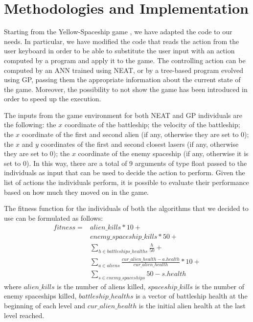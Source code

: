 \section{Methodologies and Implementation}
Starting from the Yellow-Spaceship game \cite{Yellow-Spaceship}, we have adapted the code to our needs.
In particular, we have modified the code that reads the action from the user keyboard in order to be
able to substitute the user input with an action computed by a program and apply it to the game.
The controlling action can be computed by an ANN trained using NEAT, or by a tree-based program evolved 
using GP, passing them the appropriate information about the current state of the game.
Moreover, the possibility to not show the game has been introduced in order to speed up the execution.

The inputs from the game environment for both NEAT and GP individuals are the following:
the $x$ coordinate of the battleship; the velocity of the battleship;
the $x$ coordinate of the first and second alien (if any, otherwise they are set to 0);
the $x$ and $y$ coordinates of the first and second closest lasers (if any, otherwise they are set to 0);
the $x$ coordinate of the enemy spaceship (if any, otherwise it is set to 0).
In this way, there are a total of 9 arguments of type float passed to the individuals as input that
can be used to decide the action to perform. Given the list of actions the individuals perform, it is
possible to evaluate their performance based on how much they moved on in the game.

The fitness function for the individuals of both the algorithms that we decided to use can be
formulated as follows:
\begin{equation}
\begin{split}
    fitness = & alien\_kills * 10 + \\
              & enemy\_spaceship\_kills * 50 + \\
              & \sum_{h \in battleships\_healths}^{} \frac{h}{50} + \\
              & \sum_{a \in aliens}^{} \frac{cur\_alien\_health - a.health}{cur\_alien\_health} * 10 + \\
              & \sum_{s \in enemy\_spaceships}^{} 50 - s.health
\end{split}
\end{equation}
where $alien\_kills$ is the number of aliens killed, 
$spaceship\_kills$ is the number of enemy spaceships killed,
$battleship\_healths$ is a vector of battleship health at the beginning of each level and
$cur\_alien\_health$ is the initial alien health at the last level reached. 

